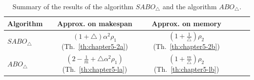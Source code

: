 \documentclass[twocolumn]{svjour3}
\begin{document}
\begin{table}[ht]
  \centering
  \begin{tabular}{|l|c|c|c|c|c|}
    \hline
    Algorithm & Approx. on makespan & Approx. on memory  \\
    \hline
    $SABO_\triangle$&
    $(1+\triangle)\alpha^2 \rho_1$ (Th.~\ref{th:chapter5-2a})& $(1+\frac{1}{\triangle})\rho_2$ (Th.~\ref{th:chapter5-2b})   \\
    \hline
    $ABO_\triangle$&
    $(2-\frac{1}{m}+\triangle\alpha^2 \rho_1)$ (Th.~\ref{th:chapter5-la})& $(1+\frac{m}{\triangle})\rho_2$ (Th.~\ref{th:chapter5-lb})   \\
    
    
    
    
    \hline
  \end{tabular}
  \caption{Summary of the results of the algorithm $SABO_\triangle$ and the algorithm $ABO_\triangle$.}
  \label{tab:template2}
\end{table}
     
\end{document}
